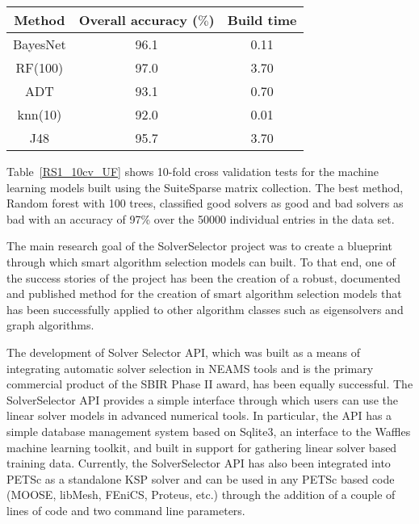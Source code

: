 \begin{table*}[h]
\centering
\caption{Convergence model accuracy and build time for 10-fold cross validation with SuiteSparse data set.}
\label{RS1_10cv_UF}
\begin{tabular}{|c|c|c|}    \hline  

Method                & Overall accuracy ($\%$)  & Build time \\ \hline\hline
BayesNet              &	96.1                    & 0.11	\\ \hline	    
RF(100)   &           97.0                    & 3.70	\\ \hline      
ADT                              &  93.1	                & 0.70	\\ \hline  
knn(10)                             &	92.0                    & 0.01	\\ \hline	    
J48                           &	95.7                    & 3.70	\\ \hline 	    
\end{tabular}
\end{table*}

Table~\ref{RS1_10cv_UF} shows 10-fold cross validation tests for the machine learning models built using the SuiteSparse matrix collection. The best method, Random forest with 100 trees, classified good solvers as good and bad solvers as bad with an accuracy of 97\% over the 50000 individual entries in the data set.

The main research goal of the SolverSelector project was to create a blueprint through which smart algorithm selection models can built. To that end, one of the success stories of the project has been the creation of a robust, documented and published method for the creation of smart algorithm selection models that has been successfully applied to other algorithm classes such as eigensolvers and graph algorithms.   

The development of Solver Selector API, which was built as a means of integrating automatic solver selection in NEAMS tools and is the primary commercial product of the SBIR Phase II award, has been equally successful. The SolverSelector API provides a simple interface through which users can use the linear solver models in advanced numerical tools. In particular, the API has a simple database management system based on Sqlite3, an interface to the Waffles machine learning toolkit, and built in support for gathering linear solver based training data. Currently, the SolverSelector API has also been integrated into PETSc as a standalone KSP solver and can be used in any PETSc based code (MOOSE, libMesh, FEniCS, Proteus, etc.) through the addition of a couple of lines of code and two command line parameters.

